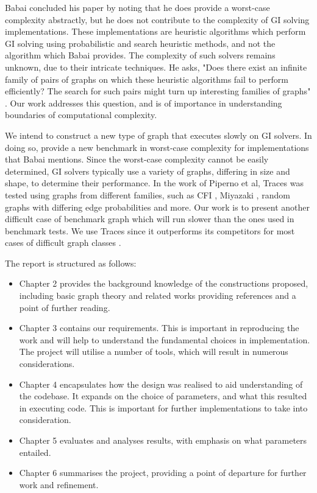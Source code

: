 \newpage
Babai concluded his paper by noting that he does provide a worst-case complexity abstractly, but he does not contribute to the complexity of GI solving implementations. These implementations are heuristic algorithms which perform GI solving using probabilistic and search heuristic methods, and not the algorithm which Babai provides. The complexity of such solvers remains unknown, due to their intricate techniques. He asks, "Does there exist an infinite family of pairs of graphs on which these heuristic algorithms fail to perform efficiently? The search for such pairs might turn up interesting families of graphs" \cite{babai2016graph}. Our work addresses this question, and is of importance in understanding boundaries of computational complexity. 
\par
We intend to construct a new type of graph that executes slowly on GI solvers. In doing so, provide a new benchmark in worst-case complexity for implementations that Babai mentions. Since the worst-case complexity cannot be easily determined, GI solvers typically use a variety of graphs, differing in size and shape, to determine their performance. In the work of Piperno et al, Traces was tested using graphs from different families, such as CFI \cite{cai1992optimal}, Miyazaki \cite{miyazaki1997complexity}, random graphs with differing edge probabilities and more. Our work is to present another difficult case of benchmark graph which will run slower than the ones used in benchmark tests. We use Traces since it outperforms its competitors for most cases of difficult graph classes \cite{mckay2014practical}. 
\par
The report is structured as follows:
\begin{itemize}
	\item Chapter 2 provides the background knowledge of the constructions proposed, including basic graph theory and related works providing references and a point of further reading.
	\item Chapter 3 contains our requirements. This is important in reproducing the work and will help to understand the fundamental choices in implementation.  The project will utilise a number of tools, which will result in numerous considerations. 
	\item Chapter 4 encapsulates how the design was realised to aid understanding of the codebase. It expands on the choice of parameters, and what this resulted in executing code. This is important for further implementations to take into consideration. 
	\item Chapter 5 evaluates and analyses results, with emphasis on what parameters entailed. 
	\item Chapter 6 summarises the project, providing a point of departure for further work and refinement.
\end{itemize}





